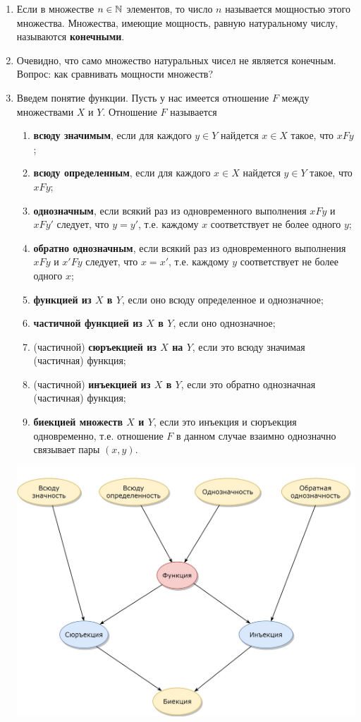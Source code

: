 \begin{enumerate}
\item Если в множестве $n\in\mathbb N$ элементов, то число $n$ называется мощностью этого множества. Множества, имеющие мощность, равную натуральному числу, называются \textbf{конечными}.
\item Очевидно, что само множество натуральных чисел не является конечным. Вопрос: как сравнивать мощности множеств?
\item Введем понятие функции. Пусть у нас имеется отношение $F$ между множествами $X$ и $Y$. Отношение $F$ называется
\begin{enumerate}[{\bf Func1}]
\item \textbf{всюду значимым}, если для каждого $y\in Y$ найдется $x\in X$ такое, что $xFy$;
\item \textbf{всюду определенным}, если для каждого $x\in X$ найдется $y\in Y$ такое, что $xFy$;
\item \textbf{однозначным}, если всякий раз из одновременного выполнения $xFy$ и $xFy'$ следует, что $y=y'$, т.е. каждому $x$ соответствует не более одного $y$;
\item \textbf{обратно однозначным}, если всякий раз из одновременного выполнения $xFy$ и $x'Fy$ следует, что $x=x'$, т.е. каждому $y$ соответствует не более одного $x$;
\item \textbf{функцией из $X$ в $Y$}, если оно всюду определенное и однозначное;
\item \textbf{частичной функцией из $X$ в $Y$}, если оно однозначное;
\item (частичной) \textbf{сюръекцией из $X$ на $Y$}, если это всюду значимая (частичная) функция;
\item (частичной) \textbf{инъекцией из $X$ в $Y$}, если это обратно однозначная (частичная) функция;
\item \textbf{биекцией множеств $X$ и $Y$}, если это инъекция и сюръекция одновременно, т.е. отношение $F$ в данном случае взаимно однозначно связывает пары $(x,y)$.
\end{enumerate}
\begin{center}
\includegraphics[scale=0.3]{function.png}
\end{center}


\end{enumerate}

